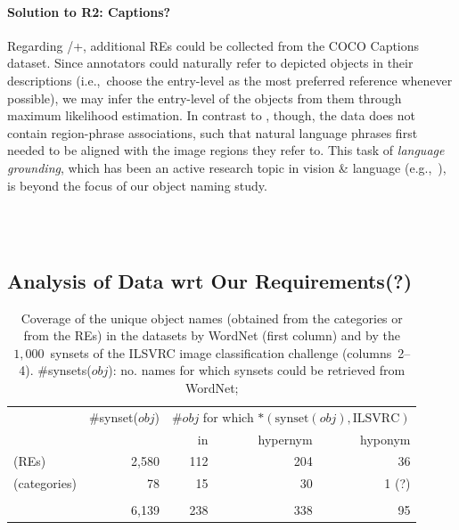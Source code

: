 {\paragraph{Solution to R2: Captions?}
Regarding /+, additional REs could be collected from the COCO Captions dataset. %
Since annotators could naturally refer to depicted objects in their descriptions (i.e.,~choose the entry-level as the most preferred reference whenever possible), we may infer the entry-level of the objects from them through maximum likelihood estimation. 
%
In contrast to \flickr, though, the data does not contain region-phrase associations,  %
such that natural language phrases first needed to be aligned with the image regions they refer to. 
This task of \textit{language grounding}, which has been an active research topic in vision \& language (e.g.,~\cite{kong2014what,karpathy2015deep,rohrbach2016grounding}), is beyond the focus of our object naming study. 

\\\\

\subsection{Analysis of Data wrt Our Requirements(?)}

\begin{table}[t]
	\begin{center}
	\begin{tabular}{l|r|rrr}
		\hline
				& \#synset($obj$) 
				& \multicolumn{3}{c}{\#$obj$ for which $*(\text{synset}(obj), \text{ILSVRC})$} \\
				&
				& in
				& hypernym
				& hyponym\\
		\hline \hline
		   (REs)		& 2,580 & 112 	& 204 	& 36\\
		  (categories)	& 78	& 15 	& 30 	& 1 (?) \\
		\vgenome 	& \\
		\flickr					& 6,139 & 238	& 338	& 95\\
		\hline
	\end{tabular}
	\caption{Coverage of the unique object names (obtained from the categories or  from the REs) in the datasets by WordNet (first column) and by the $1,000$~synsets of the ILSVRC image classification challenge (columns~2--4).  \#synsets($obj$): no. names for which synsets could be retrieved from WordNet;   \label{tab:coverage_ilsvrc}}
	\end{center}
\end{table}


}
